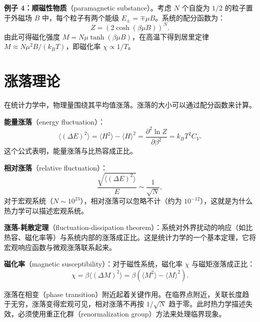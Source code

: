 \begin{example}[顺磁性物质]
\textbf{例子 4：顺磁性物质}（paramagnetic substance）。考虑 $N$ 个自旋为 $1/2$ 的粒子置于外磁场 $B$ 中，每个粒子有两个能级 $E_\pm = \mp \mu B$。系统的配分函数为：
\begin{equation}
    Z = \left(2\cosh(\beta\mu B)\right)^N.
\end{equation}
由此可得磁化强度 $M = N\mu\tanh(\beta\mu B)$，在高温下得到居里定律 $M \approx N\mu^2 B/(k_B T)$，即磁化率 $\chi \propto 1/T$。
\end{example}

\section{涨落理论}

在统计力学中，物理量围绕其平均值涨落。涨落的大小可以通过配分函数来计算。

\begin{theorem}[能量涨落与比热容]
\textbf{能量涨落}（energy fluctuation）：
\begin{equation}
    \langle (\Delta E)^2 \rangle = \langle H^2 \rangle - \langle H \rangle^2 = \frac{\partial^2 \ln Z}{\partial \beta^2} = k_B T^2 C_V.
\end{equation}
这个公式表明，能量涨落与比热容成正比。
\end{theorem}

\textbf{相对涨落}（relative fluctuation）：
\begin{equation}
    \frac{\sqrt{\langle (\Delta E)^2 \rangle}}{E} \sim \frac{1}{\sqrt{N}},
\end{equation}
对于宏观系统（$N \sim 10^{23}$），相对涨落可以忽略不计（约为 $10^{-12}$），这就是为什么热力学可以描述宏观系统。

\begin{theorem}[涨落-耗散定理]
\textbf{涨落-耗散定理}（fluctuation-dissipation theorem）：系统对外界扰动的响应（如比热容、磁化率等）与系统内部的涨落成正比。这是统计力学的一个基本定理，它将宏观响应函数与微观涨落联系起来。
\end{theorem}

\textbf{磁化率}（magnetic susceptibility）：对于磁性系统，磁化率 $\chi$ 与磁矩涨落成正比：
\begin{equation}
    \chi = \beta \langle (\Delta M)^2 \rangle = \beta (\langle M^2 \rangle - \langle M \rangle^2).
\end{equation}

\begin{remark}[涨落与相变]
涨落在相变（phase transition）附近起着关键作用\cite{Landau1937}。在临界点附近，关联长度趋于无穷，涨落变得宏观可见，相对涨落不再按 $1/\sqrt{N}$ 趋于零。此时热力学描述失效，必须使用重正化群（renormalization group）方法\cite{Wilson1974}来处理临界现象。
\end{remark}

